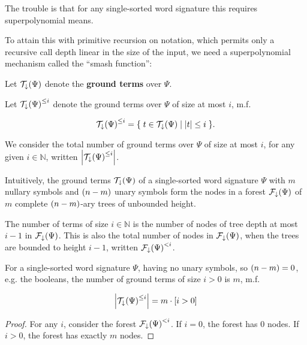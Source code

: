 The trouble is that for any single-sorted word signature this requires
superpolynomial means.


 
To attain this with primitive recursion on notation, which
permits only a recursive call depth linear in the size of the input, we need a
superpolynomial mechanism called the ``smash function'': 


\begin{definition} Let $\mathcal{T}_\downarrow{\ensuremath{\mathopen{}\left({\Psi}\right)\mathclose{}}}$ denote the
\textbf{ground terms} over $\Psi$. \end{definition}

\begin{definition} Let $\mathcal{T}_\downarrow{\ensuremath{\mathopen{}\left({\Psi}\right)\mathclose{}}}^{\leq i}$ denote the
ground terms over $\Psi$ of size at most $i$, m.f.

$$\mathcal{T}_\downarrow{\ensuremath{\mathopen{}\left({\Psi}\right)\mathclose{}}}^{\leq i} = \mathopen{}\left\{\mathrel{}{ t \in
\mathcal{T}_\downarrow{\ensuremath{\mathopen{}\left({\Psi}\right)\mathclose{}}} \mathrel{}\mid\mathrel{}{ {\mathopen{}\left|{t}\right|\mathclose{}} \leq i }}\mathrel{}\right\}\mathclose{}.$$

\end{definition}

We consider the total number of ground terms over $\Psi$ of size at most $i$,
for any given $i \in \mathbb{N}$, written
${\mathopen{}\left|{\mathcal{T}_\downarrow{\ensuremath{\mathopen{}\left({\Psi}\right)\mathclose{}}}^{\leq i}}\right|\mathclose{}}$.

Intuitively, the ground terms $\mathcal{T}_\downarrow{\ensuremath{\mathopen{}\left({\Psi}\right)\mathclose{}}}$ of a
single-sorted word signature $\Psi$ with $m$ nullary symbols and ${\mathopen{}\left({n-m}\right)\mathclose{}}$
unary symbols form the nodes in a forest $\mathcal{F}_\downarrow{\ensuremath{\mathopen{}\left({\Psi}\right)\mathclose{}}}$ of
$m$ complete ${\mathopen{}\left({n-m}\right)\mathclose{}}$-ary trees of unbounded height.

The number of terms of size $i\in\mathbb{N}$ is the number of nodes of tree
depth at most $i-1$ in $\mathcal{F}_\downarrow{\ensuremath{\mathopen{}\left({\Psi}\right)\mathclose{}}}$. This is also the total
number of nodes in $\mathcal{F}_\downarrow{\ensuremath{\mathopen{}\left({\Psi}\right)\mathclose{}}}$, when the trees are bounded
to height $i-1$, written $\mathcal{F}_\downarrow{\ensuremath{\mathopen{}\left({\Psi}\right)\mathclose{}}}^{< i}$.

\begin{theorem} For a single-sorted word signature $\Psi$, having no unary
symbols, so ${\mathopen{}\left({n-m}\right)\mathclose{}}=0$, e.g. the booleans, the number of ground terms of size
$i>0$ is $m$, m.f.

$${\mathopen{}\left|{\mathcal{T}_\downarrow{\ensuremath{\mathopen{}\left({\Psi}\right)\mathclose{}}}^{\leq i}}\right|\mathclose{}} = m \cdot \mathopen{}\left[{i>0}\right]\mathclose{}$$

\end{theorem}

\begin{proof} For any $i$, consider the forest
$\mathcal{F}_\downarrow{\ensuremath{\mathopen{}\left({\Psi}\right)\mathclose{}}}^{< i}$. If $i=0$, the forest has $0$ nodes.  If
$i>0$, the forest has exactly $m$ nodes. \end{proof}

